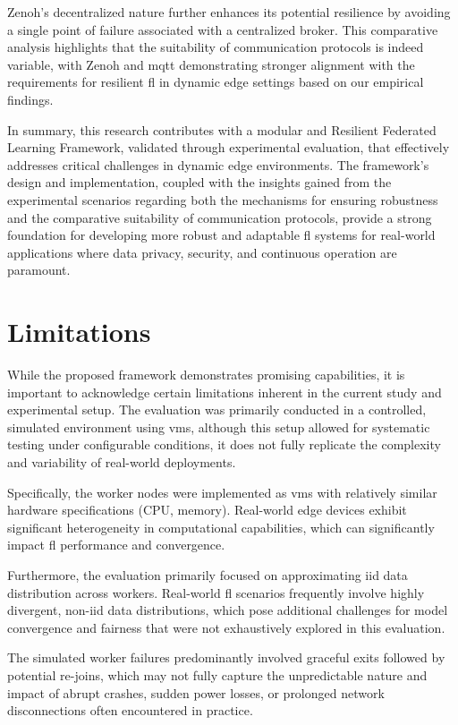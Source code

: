 Zenoh's decentralized nature further enhances its potential resilience by avoiding a single point of failure associated with a centralized broker. This comparative analysis highlights that the suitability of communication protocols is indeed variable, with Zenoh and \ac{mqtt} demonstrating stronger alignment with the requirements for resilient \ac{fl} in dynamic edge settings based on our empirical findings.

In summary, this research contributes with a modular and Resilient Federated Learning Framework, validated through experimental evaluation, that effectively addresses critical challenges in dynamic edge environments. The framework's design and implementation, coupled with the insights gained from the experimental scenarios regarding both the mechanisms for ensuring robustness and the comparative suitability of communication protocols, provide a strong foundation for developing more robust and adaptable \ac{fl} systems for real-world applications where data privacy, security, and continuous operation are paramount.



\section{Limitations}
\label{sec:limitations}

While the proposed framework demonstrates promising capabilities, it is important to acknowledge certain limitations inherent in the current study and experimental setup. The evaluation was primarily conducted in a controlled, simulated environment using \acp{vm}, although this setup allowed for systematic testing under configurable conditions, it does not fully replicate the complexity and variability of real-world deployments.

Specifically, the worker nodes were implemented as \acp{vm} with relatively similar hardware specifications (CPU, memory). Real-world edge devices exhibit significant heterogeneity in computational capabilities, which can significantly impact \ac{fl} performance and convergence. 

Furthermore, the evaluation primarily focused on approximating \ac{iid} data distribution across workers. Real-world \ac{fl} scenarios frequently involve highly divergent, \ac{non-iid} data distributions, which pose additional challenges for model convergence and fairness that were not exhaustively explored in this evaluation. 

The simulated worker failures predominantly involved graceful exits followed by potential re-joins, which may not fully capture the unpredictable nature and impact of abrupt crashes, sudden power losses, or prolonged network disconnections often encountered in practice. 

